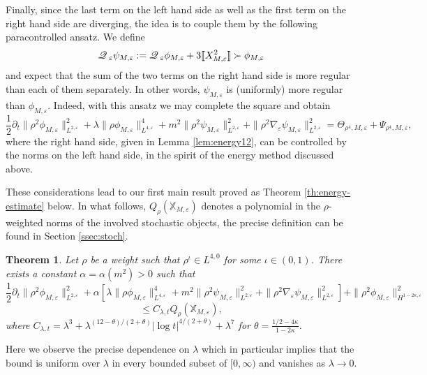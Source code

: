 \documentclass[a4paper,11pt]{article}
\newcommand{\assign}{:=}
\newtheorem{theorem}{Theorem}[section]
\numberwithin{equation}{section}
\newcommand{\Q}{\mathscr{Q} \hspace{.2em}}
\begin{document}
Finally, since the last term on the left hand side as well as the first term
on the right hand side are diverging, the idea is to couple them by the
following paracontrolled ansatz. We define
\[\Q_{\varepsilon} \psi_{M, \varepsilon} \assign \Q_{\varepsilon} \phi_{M, \varepsilon} + 3 \llbracket X_{M,
   \varepsilon}^2 \rrbracket \succ \phi_{M, \varepsilon} \]
and expect that the sum of the two terms on the right hand side is more
regular than each of them separately. In other words, $\psi_{M,
\varepsilon}$ is (uniformly) more regular than $\phi_{M, \varepsilon}$.
Indeed, with this ansatz we may complete the square and  obtain
\[ \frac{1}{2} \partial_t \| \rho^2 \phi_{M, \varepsilon} \|_{L^{2,
   \varepsilon}}^2 + \lambda \| \rho \phi_{M, \varepsilon} \|_{L^{4,
   \varepsilon}}^4 + m^2 \| \rho^2 \psi_{M, \varepsilon} \|_{L^{2,
   \varepsilon}}^2 + \| \rho^2 \nabla_{\varepsilon} \psi_{M, \varepsilon}
   \|_{L^{2, \varepsilon}}^2 = \Theta_{\rho^4, M, \varepsilon} + \Psi_{\rho^4,
   M, \varepsilon}, \]
where the right hand side, given in Lemma \ref{lem:energy12}, can be controlled
by the norms on the left hand side, in the spirit of the energy method 
discussed above.

These considerations lead  to our first main result proved as Theorem
\ref{th:energy-estimate} below. In what follows,   $Q_{\rho}(\mathbb{X}_{M,\varepsilon})$ denotes a polynomial in the $\rho$-weighted norms of the involved stochastic objects, the precise definition can be found in Section \ref{ssec:stoch}.

\begin{theorem}
  \label{th:energy-estimate-int}Let $\rho$ be a weight such that $\rho^{\iota}
  \in L^{4, 0}$ for some $\iota \in (0, 1)$. There exists a constant $\alpha =
  \alpha (m^2) > 0$ such that
  \[ \frac{1}{2} \partial_t \| \rho^2 \phi_{M, \varepsilon} \|_{L^{2,
     \varepsilon}}^2 + \alpha [\lambda \| \rho \phi_{M, \varepsilon} \|_{L^{4,
     \varepsilon}}^4 + m^2 \| \rho^2 \psi_{M, \varepsilon} \|_{L^{2,
     \varepsilon}}^2 + \| \rho^2 \nabla_{\varepsilon} \psi_{M, \varepsilon}
     \|_{L^{2, \varepsilon}}^2] + \| \rho^2 \phi_{M, \varepsilon} \|_{H^{1 - 2
     \kappa, \varepsilon}}^2 \]
  \[ \leqslant C_{\lambda, t} Q_{\rho} (\mathbb{X}_{M, \varepsilon}), \]
  where $C_{\lambda, t} = \lambda^3 + \lambda^{(12 - \theta) / (2 + \theta)} |
  \log t |^{4 / (2 + \theta)} + \lambda^7$ for $\theta = \frac{1 / 2 - 4
  \kappa}{1 - 2 \kappa}$.
\end{theorem}

Here we observe the precise dependence on $\lambda$ which in particular
implies that the bound is uniform over $\lambda$ in every bounded subset of
$[0, \infty)$ and vanishes as $\lambda \rightarrow 0$.
\end{document}
